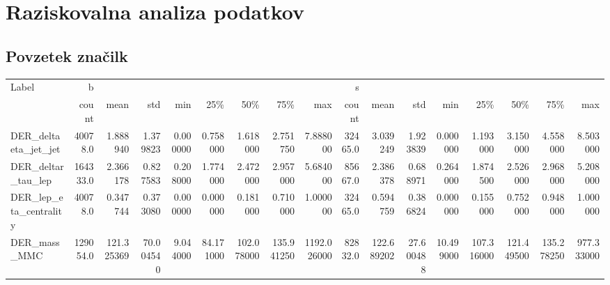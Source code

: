 \appendix
{}
\chapter{Raziskovalna analiza podatkov}
\label{ch:dodatek_raziskovalna}

\section{Povzetek značilk}

\begin{table}[ht]
	\centering
	\begin{tabular}{lrrrrrrrrrrrrrrrr}
		\hline
		Label &         b &                &               &                &                &                &                &                &        s &                &               &                &                &                &                &                \\
		{} &     count &           mean &           std &            min &            25\% &            50\% &            75\% &            max &    count &           mean &           std &            min &            25\% &            50\% &            75\% &            max \\
		\hline
		DER\_deltaeta\_jet\_jet        &   40078.0 &       1.888940 &      1.379823 &       0.000000 &       0.758000 &       1.618000 &       2.751750 &       7.888000 &  32465.0 &       3.039249 &      1.923839 &       0.000000 &       1.193000 &       3.150000 &       4.558000 &       8.503000 \\
		DER\_deltar\_tau\_lep          &  164333.0 &       2.366178 &      0.827583 &       0.208000 &       1.774000 &       2.472000 &       2.957000 &       5.684000 &  85667.0 &       2.386378 &      0.688971 &       0.264000 &       1.874500 &       2.526000 &       2.968000 &       5.208000 \\
		DER\_lep\_eta\_centrality      &   40078.0 &       0.347744 &      0.373080 &       0.000000 &       0.000000 &       0.181000 &       0.710000 &       1.000000 &  32465.0 &       0.594759 &      0.386824 &       0.000000 &       0.155000 &       0.752000 &       0.948000 &       1.000000 \\
		DER\_mass\_MMC                &  129054.0 &     121.325369 &     70.004540 &       9.044000 &      84.171000 &     102.078000 &     135.941250 &    1192.026000 &  82832.0 &     122.689202 &     27.600488 &      10.499000 &     107.316000 &     121.449500 &     135.278250 &     977.333000 \\

\end{tabular}
\end{table}
